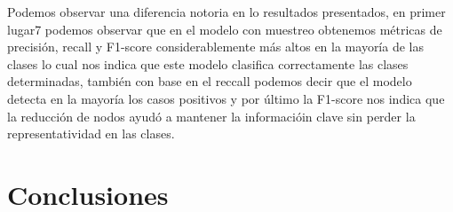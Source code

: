 Podemos observar una diferencia notoria en lo resultados presentados, en primer lugar7 podemos observar que en el modelo con muestreo obtenemos métricas de precisión, recall y F1-score considerablemente más altos en la mayoría de las clases lo cual nos indica que este modelo clasifica correctamente las clases determinadas, también con base en el reccall podemos decir que el modelo detecta en la mayoría los casos positivos y por último la F1-score nos indica que la reducción de nodos ayudó a mantener la informacióin clave sin perder la representatividad en las clases.



\section{Conclusiones}